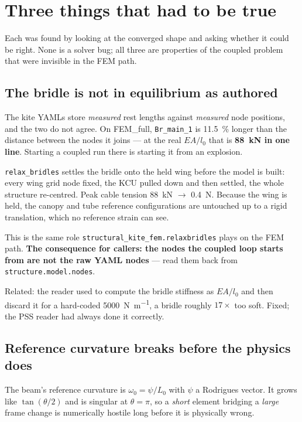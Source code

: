 \documentclass[11pt,a4paper]{article}
\newcommand{\code}[1]{\texttt{\small #1}}
\begin{document}
\section{Three things that had to be true}

Each was found by looking at the converged shape and asking whether it could be
right. None is a solver bug; all three are properties of the coupled problem
that were invisible in the FEM path.

\subsection{The bridle is not in equilibrium as authored}

The kite YAMLs store \emph{measured} rest lengths against \emph{measured} node
positions, and the two do not agree. On FEM\_full, \code{Br\_main\_1} is
\SI{11.5}{\percent} longer than the distance between the nodes it joins --- at
the real $EA/l_0$ that is \textbf{\SI{88}{\kilo\newton} in one line}. Starting a
coupled run there is starting it from an explosion.

\code{relax\_bridles} settles the bridle onto the held wing before the model is
built: every wing grid node fixed, the KCU pulled down and then settled, the
whole structure re-centred. Peak cable tension \SI{88}{\kilo\newton} $\rightarrow$
\SI{0.4}{\newton}. Because the wing is held, the canopy and tube reference
configurations are untouched up to a rigid translation, which no reference
strain can see.

This is the same role \code{structural\_kite\_fem.relaxbridles} plays on the FEM
path. \textbf{The consequence for callers: the nodes the coupled loop starts
from are not the raw YAML nodes} --- read them back from
\code{structure.model.nodes}.

Related: the reader used to compute the bridle stiffness as $EA/l_0$ and then
discard it for a hard-coded \SI{5000}{\newton\per\metre}, a bridle roughly
$17\times$ too soft. Fixed; the PSS reader had always done it correctly.

\subsection{Reference curvature breaks before the physics does}

The beam's reference curvature is $\omega_0 = \psi / L_0$ with $\psi$ a
Rodrigues vector. It grows like $\tan(\theta/2)$ and is singular at
$\theta = \pi$, so a \emph{short} element bridging a \emph{large} frame change
is numerically hostile long before it is physically wrong.
\end{document}
